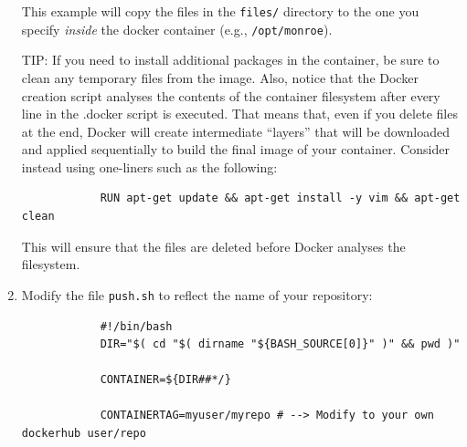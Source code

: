 \documentclass[a4paper,10pt]{article}
\newcommand{\VerbatimFont}{\footnotesize}
\newcommand{\identifier}[1]{{\texttt{\small{#1}}}}
\begin{document}
\begin{enumerate}
		This example will copy the files in the \identifier{files/} directory to the one you specify \emph{inside} the docker container (e.g., \identifier{/opt/monroe}).
		
		TIP: If you need to install additional packages in the container, be sure to clean any temporary files from the image. Also, notice that the Docker creation script analyses the contents of the container filesystem after every line in the .docker script is executed. That means that, even if you delete files at the end, Docker will create intermediate ``layers'' that will be downloaded and applied sequentially to build the final image of your container. Consider instead using one-liners such as the following:
		{\VerbatimFont\begin{verbatim}
		    RUN apt-get update && apt-get install -y vim && apt-get clean
		\end{verbatim}}
		This will ensure that the files are deleted before Docker analyses the filesystem.
	\item Modify the file \identifier{push.sh} to reflect the name of your repository:
		{\VerbatimFont\begin{verbatim}
			#!/bin/bash
			DIR="$( cd "$( dirname "${BASH_SOURCE[0]}" )" && pwd )"
			
			CONTAINER=${DIR##*/}
			
			CONTAINERTAG=myuser/myrepo # --> Modify to your own dockerhub user/repo
			

\end{verbatim}}
\end{enumerate}
\end{document}
